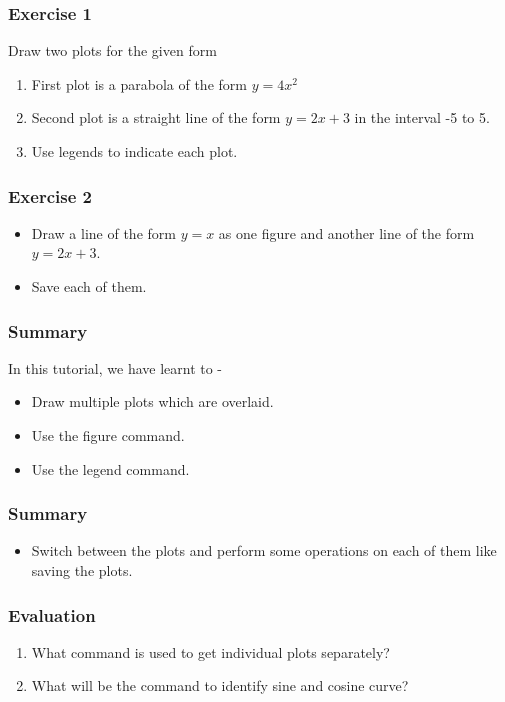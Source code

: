 \documentclass[17pt]{beamer}
\begin{document}
\begin{frame}
\frametitle{Exercise 1}
\label{sec-4}
\text Draw two plots for the given form
\begin{enumerate}
\item First plot is a parabola of the form $y = 4x^2$ \pause
\item Second plot is a straight line of the form $y = 2x + 3$ in the interval -5 to 5.\pause
\item Use legends to indicate each plot.
\end{enumerate}
\end{frame}

\begin{frame}
\frametitle{Exercise 2}
\label{sec-5}
\begin{itemize}
\item Draw a line of the form $y = x$ as one figure and another line of the form $y = 2x + 3$.\pause
\item Save each of them.
\end{itemize}
\end{frame}
\begin{frame}
\frametitle{Summary}
\label{sec-7}
In this tutorial, we have learnt to -
\begin{itemize}
\item Draw multiple plots which are overlaid.
\item Use the figure command.
\item Use the legend command.
\end{itemize}
\end{frame}
\begin{frame}
\frametitle{Summary}
\label{sec-8}
\begin{itemize}
\item Switch between the plots and perform some operations on each
of them like saving the plots.
\end{itemize}
\end{frame}

\begin{frame}
\frametitle{Evaluation}
\label{sec-8}
\begin{enumerate}
\item What command is used to get individual plots separately?
\item What will be the command to identify sine and cosine curve?
\end{enumerate}
\end{frame}
\end{document}

